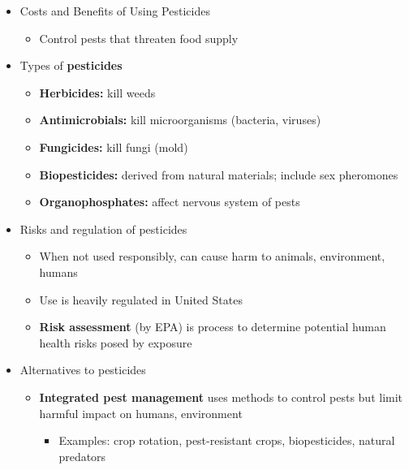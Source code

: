 \documentclass[12pt]{article}
\begin{document}
\begin{itemize}
\begin{itemize}
                    \end{itemize}
                \item Costs and Benefits of Using Pesticides
                    \begin{itemize}
                        \item Control pests that threaten food supply
                    \end{itemize}
                \item Types of \textbf{pesticides}
                    \begin{itemize}
                        \item \textbf{Herbicides:} kill weeds
                        \item \textbf{Antimicrobials:} kill microorganisms (bacteria, viruses)
                        \item \textbf{Fungicides:} kill fungi (mold)
                        \item \textbf{Biopesticides:} derived from natural materials; include sex pheromones
                        \item \textbf{Organophosphates:} affect nervous system of pests
                    \end{itemize}
                \item Risks and regulation of pesticides
                    \begin{itemize}
                        \item When not used responsibly, can cause harm to animals, environment, humans
                        \item Use is heavily regulated in United States
                        \item \textbf{Risk assessment} (by EPA) is process to determine potential human health risks posed by exposure
                    \end{itemize}
                \item Alternatives to pesticides
                    \begin{itemize}
                        \item \textbf{Integrated pest management} uses methods to control pests but limit harmful impact on humans, environment
                            \begin{itemize}
                                \item Examples: crop rotation, pest-resistant crops, biopesticides, natural predators
                            \end{itemize}
                    \end{itemize}
            \end{itemize}
\end{document}
